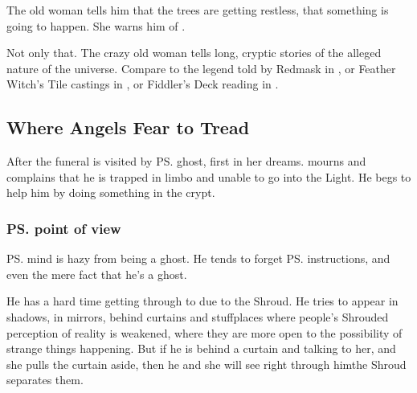The old woman tells him that the trees are getting restless, that something is going to happen. She warns him of .


Not only that. 
The crazy old woman tells long, cryptic stories of the alleged nature of the universe. Compare to the legend told by Redmask in \cite[p.340]{StevenErikson:ReapersGale}, or Feather Witch's Tile castings in \cite{StevenErikson:MidnightTides}, or Fiddler's Deck reading in \cite{StevenErikson:TheBonehunters}.






\subsection{Where Angels Fear to Tread}
After the funeral \Tiroco{} is visited by \ps{\Icor} ghost, first in her dreams. 
\Icor{} mourns and complains that he is trapped in limbo and unable to go into the Light. He begs \Tiroco{} to help him by doing something in the crypt.






\subsubsection{\ps{\Icor} point of view}
\ps{\Icor} mind is hazy from being a ghost. 
He tends to forget \ps{\Psyrex}{} instructions, and even the mere fact that he's a ghost.

He has a hard time getting through to \Tiroco{} due to the Shroud. 
He tries to appear in shadows, in mirrors, behind curtains and stuff\dash places where people's Shrouded perception of reality is weakened, where they are more open to the possibility of strange things happening. 
But if he is behind a curtain and talking to her, and she pulls the curtain aside, then he  and she will see right through him\dash the Shroud separates them. 

